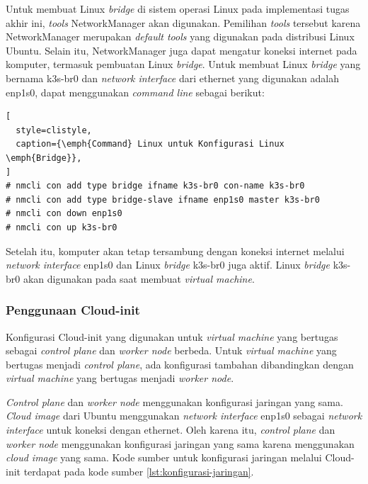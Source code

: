 Untuk membuat Linux \emph{bridge} di sistem operasi Linux pada implementasi tugas akhir ini,
\emph{tools} NetworkManager akan digunakan. Pemilihan \emph{tools} tersebut karena
NetworkManager merupakan \emph{default tools} yang digunakan pada distribusi Linux
Ubuntu. Selain itu, NetworkManager juga dapat mengatur koneksi internet pada
komputer, termasuk pembuatan Linux \emph{bridge}. Untuk membuat Linux \emph{bridge}
yang bernama k3s-br0 dan \emph{network interface} dari ethernet yang digunakan
adalah enp1s0, dapat menggunakan \emph{command line} sebagai berikut:

\begin{lstlisting}[
  style=clistyle,
  caption={\emph{Command} Linux untuk Konfigurasi Linux \emph{Bridge}},
]
# nmcli con add type bridge ifname k3s-br0 con-name k3s-br0
# nmcli con add type bridge-slave ifname enp1s0 master k3s-br0
# nmcli con down enp1s0
# nmcli con up k3s-br0
\end{lstlisting}

Setelah itu, komputer akan tetap tersambung dengan koneksi internet melalui
\emph{network interface} enp1s0 dan Linux \emph{bridge} k3s-br0 juga aktif.
Linux \emph{bridge} k3s-br0 akan digunakan pada saat membuat \emph{virtual machine}.
\subsubsection{Penggunaan Cloud-init}
\label{sec:implementasi-cloud-init}

Konfigurasi Cloud-init yang digunakan untuk \emph{virtual machine} yang bertugas sebagai \emph{control plane}
dan \emph{worker node} berbeda. Untuk \emph{virtual machine} yang bertugas menjadi \emph{control plane},
ada konfigurasi tambahan dibandingkan dengan \emph{virtual machine} yang bertugas menjadi \emph{worker node}.

\emph{Control plane} dan \emph{worker node} menggunakan konfigurasi jaringan yang sama. \emph{Cloud image}
dari Ubuntu menggunakan \emph{network interface} enp1s0 sebagai \emph{network interface} untuk
koneksi dengan ethernet. Oleh karena itu, \emph{control plane} dan \emph{worker node} menggunakan
konfigurasi jaringan yang sama karena menggunakan \emph{cloud image} yang sama. Kode sumber untuk
konfigurasi jaringan melalui Cloud-init terdapat pada kode sumber \ref{lst:konfigurasi-jaringan}.



